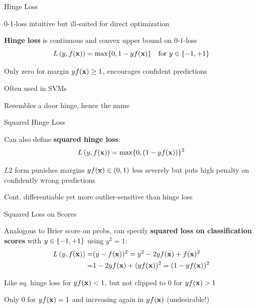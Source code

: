 \documentclass[11pt,compress,t,notes=noshow, xcolor=table]{beamer}
\begin{document}
    

\begin{framei}[sep=M]{Hinge Loss}

\item 0-1-loss intuitive but ill-suited for direct optimization
\item \textbf{Hinge loss} is continuous and convex 
upper bound on 0-1-loss 
$$L\left(y, f(\mathbf{x})\right) = \max \{ 0, 1 - y f(\mathbf{x}) \} \quad \text{for} \ y \in \{-1, +1\}$$
\item Only zero for margin $y f(\mathbf{x})\geq 1$, 
encourages confident predictions
\item Often used in SVMs
\item Resembles a door hinge, hence the name


\end{framei}


\begin{framei}[sep=M]{Squared Hinge Loss}

\item Can also define \textbf{squared hinge loss}:
$$L\left(y, f(\mathbf{x})\right) = \max \{ 0, (1 - y f(\mathbf{x}))\}^2$$
\item $L2$ form punishes margins $y f(\mathbf{x}) \in (0, 1)$ less severely but puts high penalty on confidently wrong predictions
\item Cont. differentiable yet more outlier-sensitive than hinge loss



\end{framei}


\begin{framei}[sep=M]{Squared Loss on Scores}


\item Analogous to Brier score on probs, can specify \textbf{squared loss on classification scores} with $y \in \{-1, +1\}$ using $y^2=1$:
\begin{align*}
L\left(y, f(\mathbf{x})\right) =&(y - f(\mathbf{x}))^2 = y^2 - 2y f(\mathbf{x}) + f(\mathbf{x})^2\\
=&1 - 2y f(\mathbf{x}) + (y f(\mathbf{x}))^2 = (1 - y f(\mathbf{x}))^2
\end{align*}
\item Like sq. hinge loss for $y f(\mathbf{x}) < 1$, but not clipped to $0$ for $y f(\mathbf{x})>1$
\item Only 0 for $y f(\mathbf{x}) = 1$ and increasing again in $y f(\mathbf{x})$ (undesirable!)



\end{framei}
\end{document}
